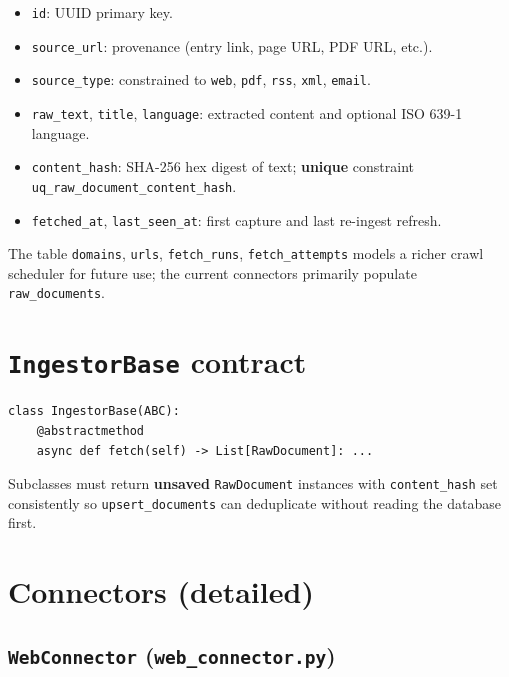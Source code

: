\documentclass[11pt,a4paper]{article}
\begin{document}
\begin{itemize}
  \item \texttt{id}: UUID primary key.
  \item \texttt{source\_url}: provenance (entry link, page URL, PDF URL, etc.).
  \item \texttt{source\_type}: constrained to \texttt{web}, \texttt{pdf}, \texttt{rss}, \texttt{xml}, \texttt{email}.
  \item \texttt{raw\_text}, \texttt{title}, \texttt{language}: extracted content and optional ISO 639-1 language.
  \item \texttt{content\_hash}: SHA-256 hex digest of text; \textbf{unique} constraint \texttt{uq\_raw\_document\_content\_hash}.
  \item \texttt{fetched\_at}, \texttt{last\_seen\_at}: first capture and last re-ingest refresh.
\end{itemize}

The table \texttt{domains}, \texttt{urls}, \texttt{fetch\_runs}, \texttt{fetch\_attempts} models a richer crawl scheduler for future use; the current connectors primarily populate \texttt{raw\_documents}.

\section{\texttt{IngestorBase} contract}

\begin{lstlisting}
class IngestorBase(ABC):
    @abstractmethod
    async def fetch(self) -> List[RawDocument]: ...
\end{lstlisting}

Subclasses must return \textbf{unsaved} \texttt{RawDocument} instances with
\texttt{content\_hash} set consistently so \texttt{upsert\_documents} can deduplicate
without reading the database first.

\section{Connectors (detailed)}

\subsection{\texttt{WebConnector} (\texttt{web\_connector.py})}
\end{document}
